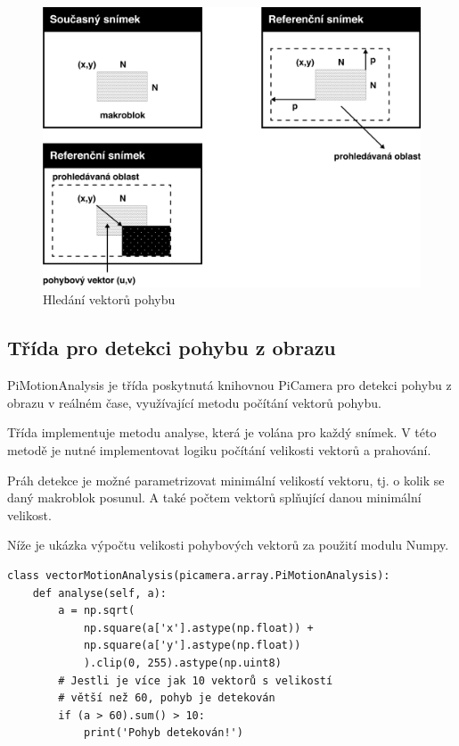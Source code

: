 \begin{figure}[h]
  \begin{center}
    \includegraphics[scale=0.5]{obrazky/makroblok.png}
  \end{center}
  \caption{Hledání vektorů pohybu}
\end{figure}

\subsection*{Třída pro detekci pohybu z obrazu}

PiMotionAnalysis je třída poskytnutá knihovnou PiCamera pro detekci pohybu z obrazu v reálném čase, využívající metodu počítání vektorů pohybu.

Třída implementuje metodu analyse, která je volána pro každý snímek. V této metodě je nutné implementovat logiku počítání velikosti vektorů a prahování.

Práh detekce je možné parametrizovat minimální velikostí vektoru, tj. o kolik se daný makroblok posunul. A také počtem vektorů splňující danou minimální velikost.

Níže je ukázka výpočtu velikosti pohybových vektorů za použití modulu Numpy.

\begin{verbatim}
class vectorMotionAnalysis(picamera.array.PiMotionAnalysis):
    def analyse(self, a):
        a = np.sqrt(
            np.square(a['x'].astype(np.float)) +
            np.square(a['y'].astype(np.float))
            ).clip(0, 255).astype(np.uint8)
        # Jestli je více jak 10 vektorů s velikostí 
        # větší než 60, pohyb je detekován
        if (a > 60).sum() > 10:
            print('Pohyb detekován!')
\end{verbatim}


